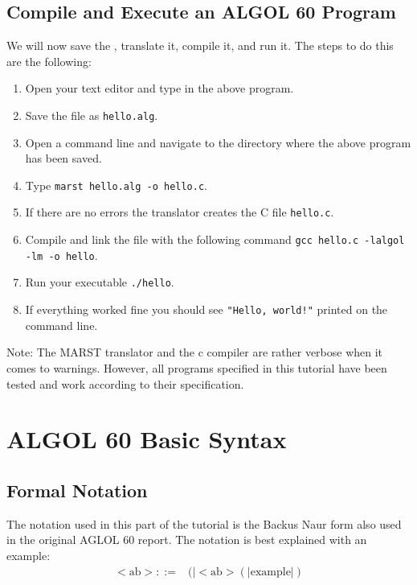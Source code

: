 \documentclass{article}
\begin{document}
\subsection{Compile and Execute an ALGOL 60 Program}
We will now save the , translate it, compile it, and run it. The steps to do this are the following:

\begin{enumerate}
	\item Open your text editor and type in the above program.
	\item Save the file as \texttt{hello.alg}.
	\item Open a command line and navigate to the directory where the above program has been saved.
	\item Type \texttt{marst hello.alg -o hello.c}.
	\item If there are no errors the translator creates the C file \texttt{hello.c}.
	\item Compile and link the file with the following command \texttt{gcc hello.c -lalgol -lm -o hello}.
	\item Run your executable \texttt{./hello}.
	\item If everything worked fine you should see \texttt{"Hello, world!"} printed on the command line.
\end{enumerate}

Note: The MARST translator and the c compiler are rather verbose when it comes to warnings. However, all programs specified in this tutorial have been tested and work according to their specification.

\newpage

\section{ALGOL 60 Basic Syntax}

\subsection{Formal Notation}
The notation used in this part of the tutorial is the Backus Naur form also used in the original AGLOL 60 report. The notation is best explained with an example:\\

\begin{equation} \label{eq1}
\begin{split}
<\text{ab}> ::=&( |<\text{ab}>(|\text{example}|)  \\
\end{split}
\end{equation}
\end{document}

